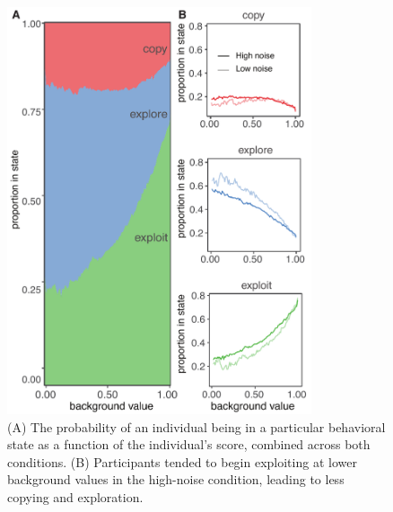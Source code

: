 \documentclass[12pt,letterpaper]{article}
\begin{document}
\begin{figure}[t!]
  \centering
  \includegraphics[width=0.8\textwidth]{./figures/new_states}
  \caption{(A) The probability of an individual being in a particular behavioral state as a function of the individual's score, combined across both conditions. (B) Participants tended to begin exploiting at lower background values in the high-noise condition, leading to less copying and exploration.}
  \label{fig:states}
\end{figure}
\end{document}
